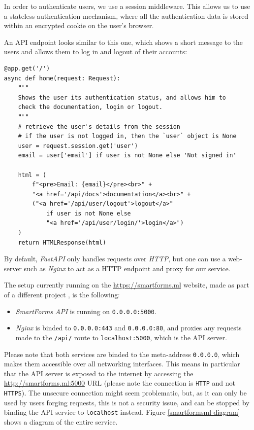 \documentclass[11pt, a4paper]{report}
\def\code#1{\texttt{#1}}
\begin{document}
In order to authenticate users, we use a session middleware. This allows us to use a stateless authentication mechanism, where all the authentication data is stored within an encrypted cookie on the user's browser.

An API endpoint looks similar to this one, which shows a short message to the users and allows them to log in and logout of their accounts:

\begin{verbatim}
@app.get('/')
async def home(request: Request):
    """
    Shows the user its authentication status, and allows him to
    check the documentation, login or logout.
    """
    # retrieve the user's details from the session
    # if the user is not logged in, then the `user` object is None
    user = request.session.get('user')
    email = user['email'] if user is not None else 'Not signed in'

    html = (
        f"<pre>Email: {email}</pre><br>" +
        "<a href='/api/docs'>documentation</a><br>" +
        ("<a href='/api/user/logout'>logout</a>"
            if user is not None else
            "<a href='/api/user/login/'>login</a>")
    )
    return HTMLResponse(html)
\end{verbatim}

By default, \textit{FastAPI} only handles requests over \textit{HTTP}, but one can use a web-server such as \textit{Nginx} \cite{nginx} to act as a HTTP endpoint and proxy for our service.

The setup currently running on the \url{https://smartforms.ml} website, made as part of a different project \cite{felix}, is the following:
\begin{itemize}
	\item \textit{SmartForms API} is running on \code{0.0.0.0:5000}.
	\item \textit{Nginx} is binded to \code{0.0.0.0:443} and \code{0.0.0.0:80}, and proxies any requests made to the \code{/api/} route to \code{localhost:5000}, which is the API server. 
\end{itemize}

Please note that both services are binded to the meta-address \code{0.0.0.0}, which makes them accessible over all networking interfaces. This means in particular that the API server is exposed to the internet by accessing the \url{http://smartforms.ml:5000} URL (please note the connection is \code{HTTP} and not \code{HTTPS}). The unsecure connection might seem problematic, but, as it can only be used by users forging requests, this is not a security issue, and can be stopped by binding the API service to \code{localhost} instead. Figure \ref{smartformsml-diagram} shows a diagram of the entire service.
\end{document}
